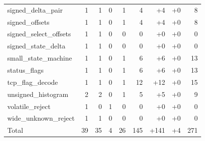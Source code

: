 \begin{table}[t]
\begin{tabular}{lrrrrrrrr}
signed\_delta\_pair & 1 & 1 & 0 & 1 & 4 & +4 & +0 & 8 \\
signed\_offsets & 1 & 1 & 0 & 1 & 4 & +4 & +0 & 8 \\
signed\_select\_offsets & 1 & 1 & 0 & 0 & 0 & +0 & +0 & 0 \\
signed\_state\_delta & 1 & 1 & 0 & 0 & 0 & +0 & +0 & 0 \\
small\_state\_machine & 1 & 1 & 0 & 1 & 6 & +6 & +0 & 13 \\
status\_flags & 1 & 1 & 0 & 1 & 6 & +6 & +0 & 13 \\
tcp\_flag\_decode & 1 & 1 & 0 & 1 & 12 & +12 & +0 & 15 \\
unsigned\_histogram & 2 & 2 & 0 & 1 & 5 & +5 & +0 & 9 \\
volatile\_reject & 1 & 0 & 1 & 0 & 0 & +0 & +0 & 0 \\
wide\_unknown\_reject & 1 & 1 & 0 & 0 & 0 & +0 & +0 & 0 \\
\hline
Total & 39 & 35 & 4 & 26 & 145 & +141 & +4 & 271 \\
\hline
\end{tabular}
\end{table}
